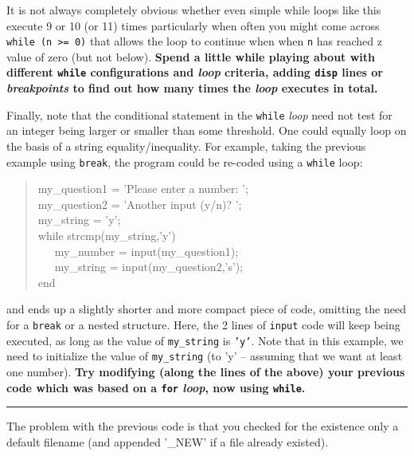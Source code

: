 \documentclass{tufte-book} %
\newenvironment{docspec}{\begin{quotation}\ttfamily\parskip0pt\parindent0pt\ignorespaces}{\end{quotation}}
\begin{document}
It is not always completely obvious whether even simple while loops like this execute 9 or 10 (or 11) times particularly when often you might come across \texttt{while (n >= 0)} that allows the loop to continue when when \texttt{n} has reached z value of zero (but not below). \textbf{Spend a little while playing about with different \texttt{while} configurations and \textit{loop} criteria, adding \texttt{disp} lines or \textit{breakpoints} to find out how many times the \textit{loop} executes in total.}

Finally, note that the conditional statement in the \texttt{while} \textit{loop} need not test for an integer being larger or smaller than some threshold. One could equally loop on the basis of a string equality/inequality. For example, taking the previous example using \texttt{break}, the program could be re-coded using a \texttt{while} loop:
\begin{docspec}
my\_question1 = 'Please enter a number: ';
\\my\_question2 = 'Another input (y/n)? ';
\\my\_string = 'y';
\\ while strcmp(my\_string,'y')
\\ \ \ \ my\_number = input(my\_question1);
\\ \ \ \ my\_string = input(my\_question2,'s');
\\end
\end{docspec}
and ends up a slightly shorter and more compact piece of code, omitting the need for a \texttt{break} or a nested structure. Here, the 2 lines of \texttt{input} code will keep being executed, as long as the value of \texttt{my\_string} is \texttt{'y'}. Note that in this example, we  need to initialize the value of \texttt{my\_string} (to 'y' -- assuming that we want at least one number). \textbf{Try modifying (along the lines of the above) your previous code which was based on a \texttt{for} \textit{loop}, now using \texttt{while}.
}

\vspace{1mm}
\noindent\rule{4cm}{0.5pt}
\vspace{-2mm}


 The problem with the previous code is that you checked for the existence only a default filename (and appended '\textsf{\_NEW}' if a file already existed).
\end{document}
